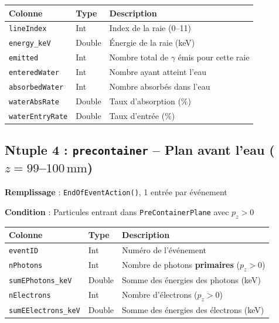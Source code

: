 \documentclass[11pt,a4paper]{article}
\newcommand{\code}[1]{\texttt{#1}}
\newcommand{\unit}[1]{\ensuremath{\,\mathrm{#1}}}
\begin{document}
\begin{table}[h]
\centering
\begin{tabular}{p{3.5cm} p{2cm} p{8cm}}
    \toprule
    \rowcolor{headerblue!20}
    \textbf{Colonne} & \textbf{Type} & \textbf{Description} \\
    \midrule
    \code{lineIndex} & Int & Index de la raie (0--11) \\
    \rowcolor{lightgray}
    \code{energy\_keV} & Double & Énergie de la raie (keV) \\
    \code{emitted} & Int & Nombre total de $\gamma$ émis pour cette raie \\
    \rowcolor{lightgray}
    \code{enteredWater} & Int & Nombre ayant atteint l'eau \\
    \code{absorbedWater} & Int & Nombre absorbés dans l'eau \\
    \rowcolor{lightgray}
    \code{waterAbsRate} & Double & Taux d'absorption (\%) \\
    \code{waterEntryRate} & Double & Taux d'entrée (\%) \\
    \bottomrule
\end{tabular}
\end{table}

\subsection{Ntuple 4 : \code{precontainer} -- Plan avant l'eau ($z = 99$--$100$\unit{mm})}

\textbf{Remplissage} : \code{EndOfEventAction()}, 1 entrée par événement

\textbf{Condition} : Particules entrant dans \code{PreContainerPlane} avec $p_z > 0$

\begin{table}[h]
\centering
\begin{tabular}{p{4cm} p{2cm} p{7.5cm}}
    \toprule
    \rowcolor{headerblue!20}
    \textbf{Colonne} & \textbf{Type} & \textbf{Description} \\
    \midrule
    \code{eventID} & Int & Numéro de l'événement \\
    \rowcolor{lightgray}
    \code{nPhotons} & Int & Nombre de photons \textbf{primaires} ($p_z > 0$) \\
    \code{sumEPhotons\_keV} & Double & Somme des énergies des photons (keV) \\
    \rowcolor{lightgray}
    \code{nElectrons} & Int & Nombre d'électrons ($p_z > 0$) \\
    \code{sumEElectrons\_keV} & Double & Somme des énergies des électrons (keV) \\
    \bottomrule
\end{tabular}
\end{table}
\end{document}

